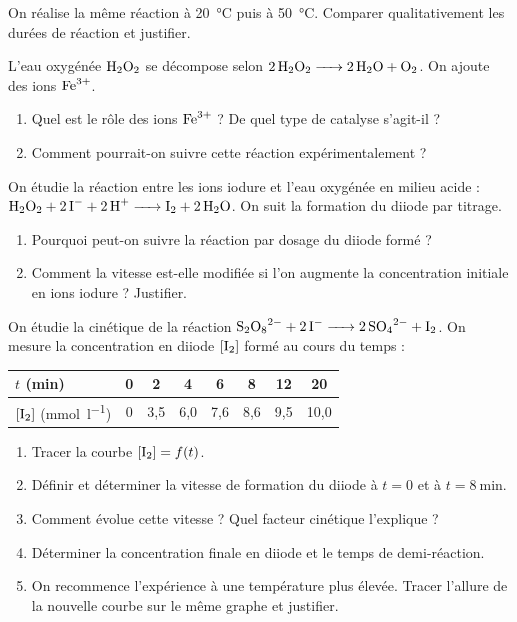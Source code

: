 
\exo{} On réalise la même réaction à \SI{20}{\celsius} puis à \SI{50}{\celsius}.
Comparer qualitativement les durées de réaction et justifier.

\exo{} L'eau oxygénée $\ce{H2O2}$ se décompose selon
$\ce{2 H2O2 -> 2 H2O + O2}$. On ajoute des ions $\ce{Fe^3+}$.
\begin{enumerate}[label=\arabic*)]
\item Quel est le rôle des ions $\ce{Fe^3+}$ ? De quel type de catalyse s'agit-il ?
\item Comment pourrait-on suivre cette réaction expérimentalement ?
\end{enumerate}

\exo{} On étudie la réaction entre les ions iodure et l'eau oxygénée en
milieu acide : $\ce{H2O2 + 2 I- + 2 H+ -> I2 + 2 H2O}$. On suit la formation du
diiode par titrage.
\begin{enumerate}[label=\arabic*)]
\item Pourquoi peut-on suivre la réaction par dosage du diiode formé ?
\item Comment la vitesse est-elle modifiée si l'on augmente la concentration
initiale en ions iodure ? Justifier.
\end{enumerate}


On étudie la cinétique de la réaction $\ce{S2O8^2- + 2 I- -> 2 SO4^2- + I2}$. On
mesure la concentration en diiode $[\ce{I2}]$ formé au cours du temps :
\begin{center}\small
\begin{tabular}{l|ccccccc}
$t$ (\si{\minute}) & 0 & 2 & 4 & 6 & 8 & 12 & 20 \\ \hline
$[\ce{I2}]$ (\si{\milli\mol\per\litre}) & 0 & 3{,}5 & 6{,}0 & 7{,}6 & 8{,}6 & 9{,}5 & 10{,}0 \\
\end{tabular}
\end{center}
\begin{enumerate}[label=\arabic*)]
\item Tracer la courbe $[\ce{I2}] = f(t)$.
\item Définir et déterminer la vitesse de formation du diiode à $t = 0$ et à
$t = \SI{8}{\minute}$.
\item Comment évolue cette vitesse ? Quel facteur cinétique l'explique ?
\item Déterminer la concentration finale en diiode et le temps de demi-réaction.
\item On recommence l'expérience à une température plus élevée. Tracer l'allure de la
nouvelle courbe sur le même graphe et justifier.
\end{enumerate}
